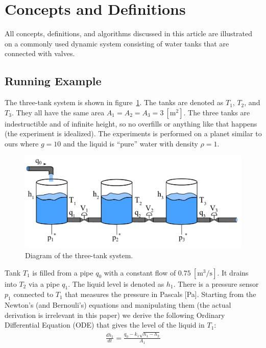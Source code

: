 \section{Concepts and Definitions}\label{sec:concepts}
%
All concepts, definitions, and algorithms discussed in this article
are illustrated on a commonly used dynamic system consisting of water
tanks that are connected with valves.
%
\subsection{Running Example}
%
The three-tank system is shown in figure~\ref{fig:three_tanks}. The
tanks are denoted as $T_1$, $T_2$, and $T_3$. They all have the
same area $A_1 = A_2 = A_3 = 3~[\textrm{m}^2]$. The three tanks are
indestructible and of infinite height, so no overfills or anything
like that happens (the experiment is idealized). The experiments is
performed on a planet similar to ours where $g = 10$ and the liquid is
``pure'' water with density $\rho = 1$.
%
\begin{figure}[htb]
  \centering
  \includegraphics[width=1\columnwidth]{3-tanks}
  \caption{Diagram of the three-tank system.}
  \label{fig:three_tanks}
\end{figure}
\par\noindent
%
Tank $T_1$ is filled from a pipe $q_0$ with a constant flow of
$0.75~[\textrm{m}^3/\textrm{s}]$. It drains into $T_2$ via a pipe
$q_1$. The liquid level is denoted as $h_1$. There is a pressure
sensor $p_1$ connected to $T_1$ that measures the pressure in Pascals
[Pa]. Starting from the Newton's (and Bernouli's) equations and
manipulating them (the actual derivation is irrelevant in this paper)
we derive the following Ordinary Differential Equation (ODE) that
gives the level of the liquid in $T_1$:
%
\begin{eqnarray}
%
\frac{d h_1}{dt} = \frac{q_0 - k_1 \sqrt{h_1 - h_2}}{A_1}\label{eq:ode1}
%
\end{eqnarray}
%
